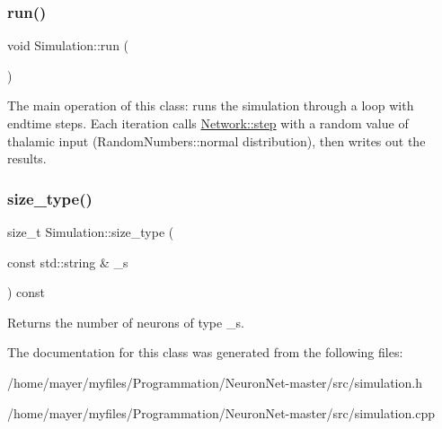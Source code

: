 \subsubsection{\texorpdfstring{run()}{run()}}
{\footnotesize\ttfamily void Simulation\+::run (\begin{DoxyParamCaption}{ }\end{DoxyParamCaption})}

The main operation of this class\+: runs the simulation through a loop with endtime steps. Each iteration calls \hyperlink{classNetwork_a53665a3a69e6ec894c313d0ce3fb7f34}{Network\+::step} with a random value of thalamic input (Random\+Numbers\+::normal distribution), then writes out the results. \mbox{\label{classSimulation_a7d0ca858dfec187001ecbab2081f9d04}} 
\subsubsection{\texorpdfstring{size\+\_\+type()}{size\_type()}}
{\footnotesize\ttfamily size\+\_\+t Simulation\+::size\+\_\+type (\begin{DoxyParamCaption}\item[{const std\+::string \&}]{\+\_\+s }\end{DoxyParamCaption}) const}

Returns the number of neurons of type \+\_\+s. 

The documentation for this class was generated from the following files\+:\begin{DoxyCompactItemize}
\item 
/home/mayer/myfiles/\+Programmation/\+Neuron\+Net-\/master/src/simulation.\+h\item 
/home/mayer/myfiles/\+Programmation/\+Neuron\+Net-\/master/src/simulation.\+cpp\end{DoxyCompactItemize}
